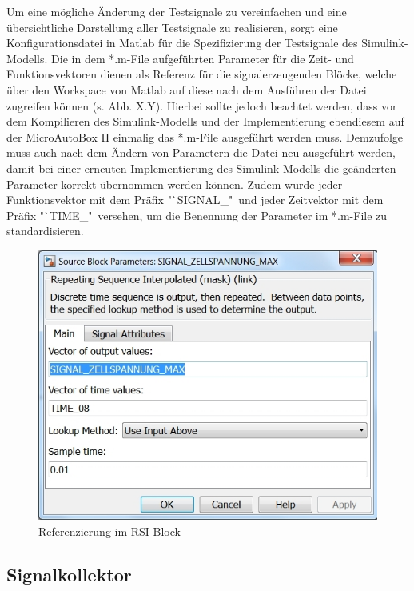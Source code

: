 \documentclass[fontsize = 12pt, paper = a4]{scrreprt}
\begin{document}
Um eine mögliche Änderung der Testsignale zu vereinfachen und eine übersichtliche Darstellung aller Testsignale zu realisieren, sorgt eine Konfigurationsdatei in Matlab für die Spezifizierung der Testsignale des Simulink-Modells. Die in dem *.m-File aufgeführten Parameter für die Zeit- und Funktionsvektoren dienen als Referenz für die signalerzeugenden Blöcke, welche über den Workspace von Matlab auf diese nach dem Ausführen der Datei zugreifen können (s. Abb. X.Y). Hierbei sollte jedoch beachtet werden, dass vor dem Kompilieren des Simulink-Modells und der Implementierung ebendiesem auf der MicroAutoBox II einmalig das *.m-File ausgeführt werden muss. Demzufolge muss auch nach dem Ändern von Parametern die Datei neu ausgeführt werden, damit bei einer erneuten Implementierung des Simulink-Modells die geänderten Parameter korrekt übernommen werden können. Zudem wurde jeder Funktionsvektor mit dem Präfix "`SIGNAL\_"\ und jeder Zeitvektor mit dem Präfix "`TIME\_"\ versehen, um die Benennung der Parameter im *.m-File zu standardisieren. \\

\begin{figure}[h]
\centering
\includegraphics[scale = 0.55]{referenz}
\caption[Referenzierung der Config-Datei]{Referenzierung im RSI-Block}
\end{figure}

\newpage

\subsection{Signalkollektor}
\end{document}

